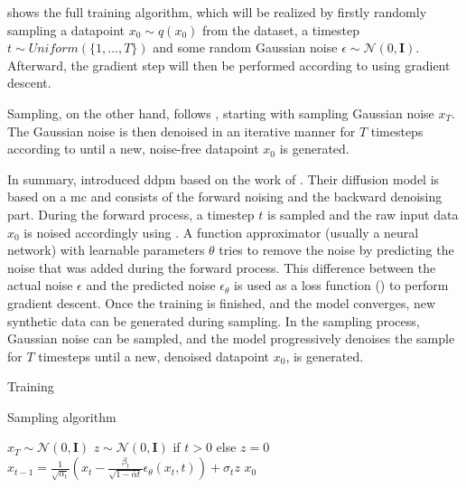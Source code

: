  shows the full training algorithm, which will be realized by firstly randomly sampling a datapoint $x_0 \sim q(x_0)$ from the dataset, a timestep $t\sim Uniform(\{1, ..., T\})$ and some random Gaussian noise $\epsilon \sim \mathcal{N}(0, \textbf{I})$.
Afterward, the gradient step will then be performed according to  using gradient descent.

Sampling, on the other hand, follows , starting with sampling Gaussian noise $x_T$.
The Gaussian noise is then denoised in an iterative manner for $T$ timesteps according to  until a new, noise-free datapoint $x_0$ is generated.

In summary, \cite{ho2020DenoisingDiffusionProbabilistic} introduced \gls{ddpm} based on the work of \cite{sohl-dickstein2015DeepUnsupervisedLearning}.
Their diffusion model is based on a \gls{mc} and consists of the forward noising and the backward denoising part.
During the forward process, a timestep $t$ is sampled and the raw input data $x_0$ is noised accordingly using .
A function approximator (usually a neural network) with learnable parameters $\theta$ tries to remove the noise by predicting the noise that was added during the forward process.
This difference between the actual noise $\epsilon$ and the predicted noise $\epsilon_{\theta}$ is used as a loss function () to perform gradient descent.
Once the training is finished, and the model converges, new synthetic data can be generated during sampling.
In the sampling process, Gaussian noise can be sampled, and the model progressively denoises the sample for $T$ timesteps until a new, denoised datapoint $x_0$, is generated.

\begin{algorithm}[H]
  \caption[Training algorithm]{Training \cite[p. 4]{ho2020DenoisingDiffusionProbabilistic}}
  \label{alg:training}
\end{algorithm}

\begin{algorithm}[H]
  \caption[Sampling algorithm]{Sampling algorithm \cite[p. 4]{ho2020DenoisingDiffusionProbabilistic}}
  \label{alg:sampling}
  \begin{algorithmic}
  \State $x_T \sim \mathcal{N}(0, \mathbf{I})$
  \State $z \sim \mathcal{N}(0, \mathbf{I})$ if $t > 0$ else $z = 0$
  \State $x_{t-1} = \frac{1}{\sqrt{\alpha_t}}\left(x_t - \frac{\beta_t}{\sqrt{1-\bar{\alpha}t}}\epsilon_{\theta}(x_t,t)\right) + \sigma_t z$
  \EndFor
  \State \Return $x_0$
  \end{algorithmic}
\end{algorithm}


